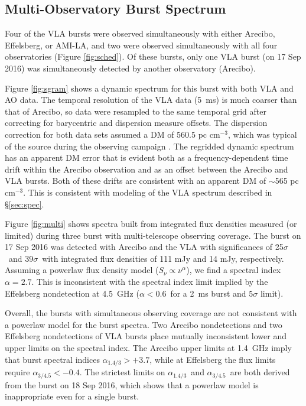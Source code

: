 \documentclass[twocolumn]{aastex61}
\begin{document}
\subsection{Multi-Observatory Burst Spectrum}

Four of the VLA bursts were observed simultaneously with either Arecibo, Effelsberg, or AMI-LA, and two were observed simultaneously with all four observatories (Figure \ref{fig:sched}). Of these bursts, only one VLA burst (on 17 Sep 2016) was simultaneously detected by another observatory (Arecibo). 

Figure \ref{fig:sgram} shows a dynamic spectrum for this burst with both VLA and AO data. The temporal resolution of the VLA data (5~ms) is much coarser than that of Arecibo, so data were resampled to the same temporal grid after correcting for barycentric and dispersion measure offsets. The dispersion correction for both data sets assumed a DM of 560.5 pc cm$^{-3}$, which was typical of the source during the observing campaign \citep{WEIRD}. The regridded dynamic spectrum has an apparent DM error that is evident both as a frequency-dependent time drift within the Arecibo observation and as an offset between the Arecibo and VLA bursts. Both of these drifts are consistent with an apparent DM of $\sim$565 pc cm$^{-3}$. This is consistent with modeling of the VLA spectrum described in \S \ref{sec:spec}.

Figure \ref{fig:multi} shows spectra built from integrated flux densities measured (or limited) during three burst with multi-telescope observing coverage. The burst on 17 Sep 2016 was detected with Arecibo and the VLA with significances of 25$\sigma$\ and 39$\sigma$\ with integrated flux densities of 111 mJy and 14 mJy, respectively. Assuming a powerlaw flux density model ($S_{\nu} \propto \nu^{\alpha}$), we find a spectral index $\alpha=2.7$. This is inconsistent with the spectral index limit implied by the Effelsberg nondetection at 4.5~GHz ($\alpha<0.6$\ for a 2~ms burst and $5\sigma$ limit).

Overall, the bursts with simultaneous observing coverage are not consistent with a powerlaw model for the burst spectra. Two Arecibo nondetections and two Effelsberg nondetections of VLA bursts place mutually inconsistent lower and upper limits on the spectral index. The Arecibo upper limits at 1.4~GHz imply that burst spectral indices $\alpha_{1.4/3}>+3.7$, while at Effelsberg the flux limits require $\alpha_{3/4.5}<-0.4$. The strictest limits on $\alpha_{1.4/3}$\ and $\alpha_{3/4.5}$\ are both derived from the burst on 18 Sep 2016, which shows that a powerlaw model is inappropriate even for a single burst.
\end{document}

